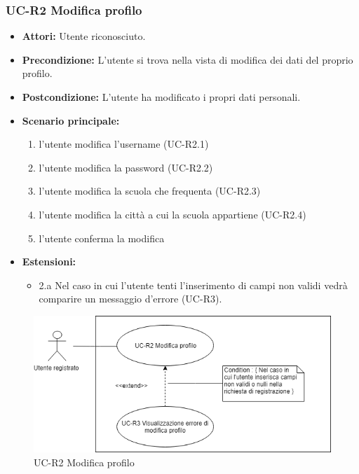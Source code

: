 \subsubsection{UC-R2 Modifica profilo}
		\begin{itemize}
			\item \textbf{Attori:} Utente riconosciuto.
			\item \textbf{Precondizione:} L'utente si trova nella vista di modifica dei dati del proprio profilo.
			\item \textbf{Postcondizione:} L'utente ha modificato i propri dati personali.
			\item \textbf{Scenario principale:}
				\begin{enumerate}
					\item l'utente modifica l'username (UC-R2.1)
					\item  l'utente modifica la password (UC-R2.2)
					\item l'utente modifica la scuola che frequenta (UC-R2.3) 
					\item l'utente modifica la città a cui la scuola appartiene (UC-R2.4)
					\item l'utente conferma la modifica
				\end{enumerate}
				\item \textbf{Estensioni:}
				\begin{itemize}
					\item 2.a Nel caso in cui l'utente tenti l'inserimento di campi non validi vedrà comparire un messaggio d'errore (UC-R3).
				\end{itemize}
		\end{itemize}
		\begin{figure}[htbp]
			\centering
			\includegraphics[scale=0.7]{images/UC-R2.png}
			\caption{UC-R2 Modifica profilo}
		\end{figure}
